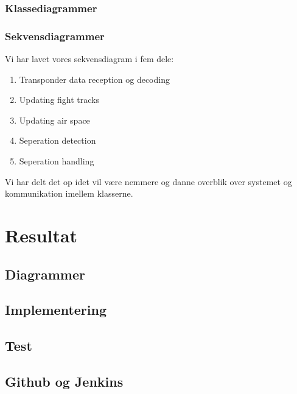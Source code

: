 \subsubsection{Klassediagrammer}

\subsubsection{Sekvensdiagrammer}
Vi har lavet vores sekvensdiagram i fem dele:
\begin{enumerate}
    \item Transponder data reception og decoding
    \item Updating fight tracks
    \item Updating air space
    \item Seperation detection
    \item Seperation handling
\end{enumerate} 
 Vi har delt det op idet vil være nemmere og danne overblik over systemet og kommunikation imellem klasserne.  

 \newpage

 \section{}
 
 \newpage

 \section{Resultat}

 \subsection{Diagrammer}

 \subsection{Implementering}

 \subsection{Test}

 \subsection{Github og Jenkins} 

